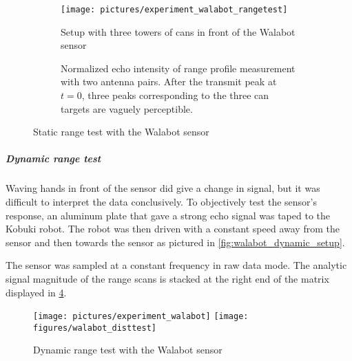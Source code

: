 \begin{figure}[htbp]
    \centering
    \begin{subfigure}{\textwidth}
        \centering
        \texttt{[image: pictures/experiment\_walabot\_rangetest]}
        \caption{Setup with three towers of cans in front of the Walabot sensor}
        \label{fig:walabot_rangetest_setup}
    \end{subfigure}
    \begin{subfigure}{\textwidth}
        \centering
        \def\svgwidth{\linewidth}
        
        \caption{Normalized echo intensity of range profile measurement with two antenna pairs. After the transmit peak at \(t=0\), three peaks corresponding to the three can targets are vaguely perceptible. }
        \label{fig:walabot_rangetest_data}
    \end{subfigure}
    \caption{Static range test with the Walabot sensor}
    \label{fig:walabot_rangetest}
\end{figure}

\subparagraph{Dynamic range test}\label{dynamic-range-test}

Waving hands in front of the sensor did give a change in signal, but it
was difficult to interpret the data conclusively. To objectively test
the sensor's response, an aluminum plate that gave a strong echo signal
was taped to the Kobuki robot. The robot was then driven with a constant
speed away from the sensor and then towards the sensor as pictured in
\cref{fig:walabot_dynamic_setup}.

The sensor was sampled at a constant frequency in raw data mode. The
analytic signal magnitude of the range scans is stacked at the right end of the
matrix displayed in \cref{fig:walabot_dynamic_data}.

\begin{figure}[htbp]
    \centering
        {\texttt{[image: pictures/experiment\_walabot]}}
        \label{fig:walabot_dynamic_setup}
    \quad
        {\texttt{[image: figures/walabot\_disttest]}}
        \label{fig:walabot_dynamic_data}
    \caption{Dynamic range test with the Walabot sensor}
\end{figure}

